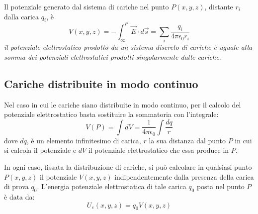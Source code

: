 \documentclass[class=book, crop=false, oneside, 12pt]{standalone}
\begin{document}
Il potenziale generato dal sistema di cariche nel punto \(P (x, y, z)\), distante \(r_i\) dalla carica \(q_i\), è 
\begin{equation}
    V(x,y,z) = - \int_{\infty}^P \overrightarrow{E} \cdot d \overrightarrow{s} = \sum_i \frac{q_i}{4 \pi \epsilon_0 r_i}
\end{equation}
\emph{il potenziale elettrostatico prodotto da un sistema discreto di cariche è uguale alla somma dei potenziali elettrostatici prodotti singolarmente dalle cariche}.

\subsection{Cariche distribuite in modo continuo}

Nel caso in cui le cariche siano distribuite in modo continuo, per il calcolo del potenziale elettrostatico basta sostituire la sommatoria con l'integrale:
\begin{equation}
    V (P) = \int dV = \frac{1}{4 \pi \epsilon_0} \int \frac{d q}{r}
\end{equation}
dove \(dq\), è un elemento infinitesimo di carica, \(r\) la sua distanza dal punto \(P\) in cui si calcola il potenziale e \(dV\) il potenziale elettrostatico che essa produce in \(P\).

In ogni caso, fissata la distribuzione di cariche, si può calcolare in qualsiasi punto \(P(x, y, z)\) il potenziale \(V(x, y, z)\) indipendentemente dalla presenza della carica di prova \(q_0\).  
L'energia potenziale elettrostatica di tale carica \(q_0\) posta nel punto \(P\) è data da:
\begin{equation}
    U_e (x,y,z) = q_0 V(x,y,z)
\end{equation}
\end{document}
